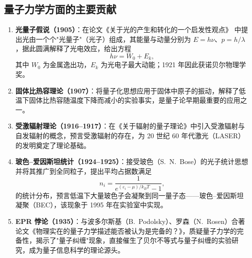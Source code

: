 \documentclass{ctexart} %
\begin{document}
\subsection*{量子力学方面的主要贡献}
\begin{enumerate}
    \item \textbf{光量子假说（1905）}：在论文《关于光的产生和转化的一个启发性观点》\cite{einstein1905photoelectric} 中提出光由一个个"光量子"（光子）组成，其能量与动量分别为 $E = h\nu$、$p = h/\lambda$，据此圆满解释了光电效应，给出方程
    \begin{equation}
        h\nu = W_0 + E_k,
        \label{eq:pe-main}
    \end{equation}
    其中 $W_0$ 为金属逸出功，$E_k$ 为光电子最大动能；1921 年因此获诺贝尔物理学奖。
    \item \textbf{固体比热容理论（1907）}：将量子化思想应用于固体中原子的振动，解释了低温下固体比热容随温度下降而减小的实验事实，是量子论早期最重要的应用之一。
    \item \textbf{受激辐射理论（1916--1917）}：在《关于辐射的量子理论》中引入受激辐射与自发辐射的概念，预言受激辐射的存在，为 20 世纪 60 年代激光（LASER）的发明奠定了理论基础。
    \item \textbf{玻色--爱因斯坦统计（1924--1925）}：接受玻色（S.~N.~Bose）的光子统计思想\cite{bose1924}并将其推广到全同粒子\cite{einstein1925bose}，提出平均占据数满足
    \begin{equation}
        n_i = \frac{1}{e^{(\varepsilon_i - \mu)/k_B T} - 1},
        \label{eq:be-main}
    \end{equation}
    的统计分布，预言低温下大量玻色子会凝聚到同一量子态——玻色--爱因斯坦凝聚（BEC），该现象于 1995 年在实验室中实现。
    \item \textbf{EPR 悖论（1935）}：与波多尔斯基（B.~Podolsky）、罗森（N.~Rosen）合著论文《物理实在的量子力学描述能否被认为是完备的？》\cite{einstein1935epr}，质疑量子力学的完备性，揭示了"量子纠缠"现象，直接催生了贝尔不等式与量子纠缠的实验研究，成为量子信息科学的理论源头。
\end{enumerate}
\end{document}
